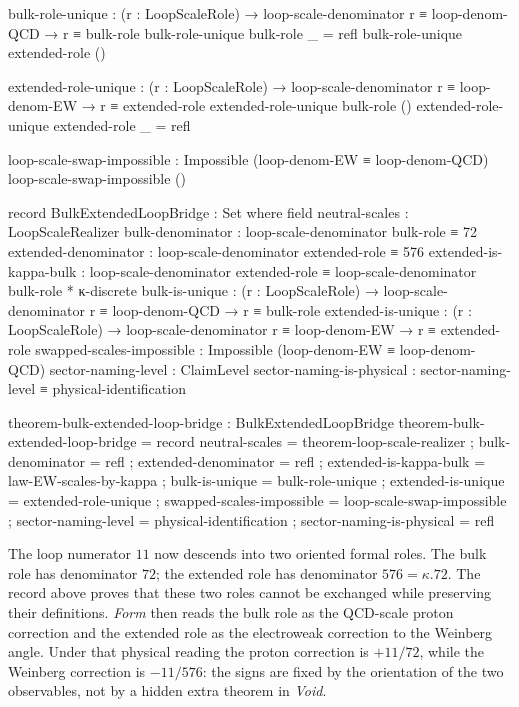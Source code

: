 \documentclass[11pt,a4paper]{book}
\def\cdot{.}%
\begin{document}
\begin{code}
bulk-role-unique :
  (r : LoopScaleRole) →
  loop-scale-denominator r ≡ loop-denom-QCD →
  r ≡ bulk-role
bulk-role-unique bulk-role _ = refl
bulk-role-unique extended-role ()

extended-role-unique :
  (r : LoopScaleRole) →
  loop-scale-denominator r ≡ loop-denom-EW →
  r ≡ extended-role
extended-role-unique bulk-role ()
extended-role-unique extended-role _ = refl

loop-scale-swap-impossible : Impossible (loop-denom-EW ≡ loop-denom-QCD)
loop-scale-swap-impossible ()

record BulkExtendedLoopBridge : Set where
  field
    neutral-scales            : LoopScaleRealizer
    bulk-denominator          : loop-scale-denominator bulk-role ≡ 72
    extended-denominator      : loop-scale-denominator extended-role ≡ 576
    extended-is-kappa-bulk    : loop-scale-denominator extended-role ≡ loop-scale-denominator bulk-role * κ-discrete
    bulk-is-unique            : (r : LoopScaleRole) → loop-scale-denominator r ≡ loop-denom-QCD → r ≡ bulk-role
    extended-is-unique        : (r : LoopScaleRole) → loop-scale-denominator r ≡ loop-denom-EW → r ≡ extended-role
    swapped-scales-impossible : Impossible (loop-denom-EW ≡ loop-denom-QCD)
    sector-naming-level       : ClaimLevel
    sector-naming-is-physical : sector-naming-level ≡ physical-identification

theorem-bulk-extended-loop-bridge : BulkExtendedLoopBridge
theorem-bulk-extended-loop-bridge = record
  { neutral-scales            = theorem-loop-scale-realizer
  ; bulk-denominator          = refl
  ; extended-denominator      = refl
  ; extended-is-kappa-bulk    = law-EW-scales-by-kappa
  ; bulk-is-unique            = bulk-role-unique
  ; extended-is-unique        = extended-role-unique
  ; swapped-scales-impossible = loop-scale-swap-impossible
  ; sector-naming-level       = physical-identification
  ; sector-naming-is-physical = refl }
\end{code}

The loop numerator $11$ now descends into two oriented formal roles.
The bulk role has denominator $72$; the extended role has denominator
$576 = \kappa \cdot 72$.  The record above proves that these two roles
cannot be exchanged while preserving their definitions.  \textit{Form}
then reads the bulk role as the QCD-scale proton correction and the
extended role as the electroweak correction to the Weinberg angle.
Under that physical reading the proton correction is $+11/72$, while
the Weinberg correction is $-11/576$: the signs are fixed by the
orientation of the two observables, not by a hidden extra theorem in
\textit{Void}.
\end{document}
